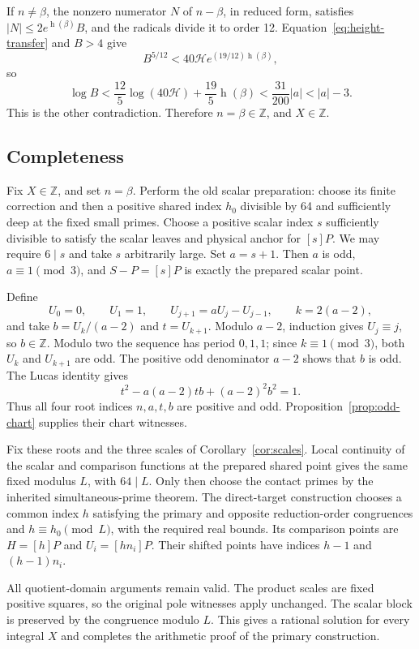 \documentclass[11pt]{article}
\newcommand{\Z}{\mathbb Z}
\newcommand{\HH}{\mathcal H}
\newcommand{\htw}{\operatorname h}
\begin{document}
If $n\ne\beta$, the nonzero numerator $N$ of $n-\beta$, in reduced form, satisfies $|N|\le2e^{\htw(\beta)}B$, and the radicals divide it to order 12. Equation~\eqref{eq:height-transfer} and $B>4$ give
\[
 B^{5/12}<40\HH e^{(19/12)\htw(\beta)},
\]
so
\[
 \log B<\frac{12}{5}\log(40\HH)+\frac{19}{5}\htw(\beta)
 <\frac{31}{200}|a|<|a|-3.
\]
This is the other contradiction. Therefore $n=\beta\in\Z$, and $X\in\Z$.

\subsection{Completeness}
Fix $X\in\Z$, and set $n=\beta$. Perform the old scalar preparation: choose its finite correction and then a positive shared index $h_0$ divisible by 64 and sufficiently deep at the fixed small primes. Choose a positive scalar index $s$ sufficiently divisible to satisfy the scalar leaves and physical anchor for $[s]P$. We may require $6\mid s$ and take $s$ arbitrarily large. Set $a=s+1$. Then $a$ is odd, $a\equiv1\pmod3$, and $S-P=[s]P$ is exactly the prepared scalar point.

Define
\[
 U_0=0,\qquad U_1=1,\qquad U_{j+1}=aU_j-U_{j-1},
 \qquad k=2(a-2),
\]
and take $b=U_k/(a-2)$ and $t=U_{k+1}$. Modulo $a-2$, induction gives $U_j\equiv j$, so $b\in\Z$. Modulo two the sequence has period $0,1,1$; since $k\equiv1\pmod3$, both $U_k$ and $U_{k+1}$ are odd. The positive odd denominator $a-2$ shows that $b$ is odd. The Lucas identity gives
\[
 t^2-a(a-2)tb+(a-2)^2b^2=1.
\]
Thus all four root indices $n,a,t,b$ are positive and odd. Proposition~\ref{prop:odd-chart} supplies their chart witnesses.

Fix these roots and the three scales of Corollary~\ref{cor:scales}. Local continuity of the scalar and comparison functions at the prepared shared point gives the same fixed modulus $L$, with $64\mid L$. Only then choose the contact primes by the inherited simultaneous-prime theorem. The direct-target construction chooses a common index $h$ satisfying the primary and opposite reduction-order congruences and $h\equiv h_0\pmod L$, with the required real bounds. Its comparison points are $H=[h]P$ and $U_i=[hn_i]P$. Their shifted points have indices $h-1$ and $(h-1)n_i$.

All quotient-domain arguments remain valid. The product scales are fixed positive squares, so the original pole witnesses apply unchanged. The scalar block is preserved by the congruence modulo $L$. This gives a rational solution for every integral $X$ and completes the arithmetic proof of the primary construction.
\end{document}
